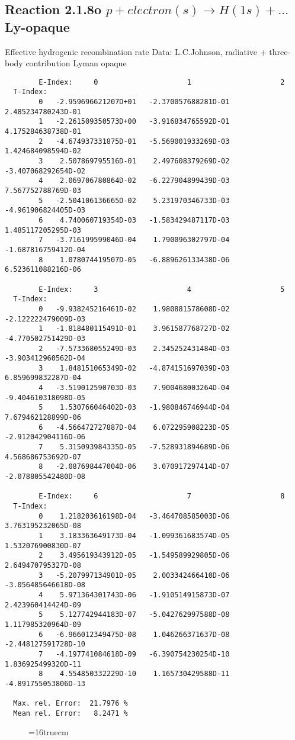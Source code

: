 \documentclass[12pt]{article}
\begin{document}
\subsection{
  Reaction 2.1.8o $ p + electron(s) \rightarrow H(1s) + ...$ Ly-opaque
}

   Effective hydrogenic recombination rate
   Data: L.C.Johnson, radiative + three-body contribution
   Lyman opaque


\begin{small}\begin{verbatim}
        E-Index:     0                     1                     2
  T-Index:
        0   -2.959696621207D+01   -2.370057688281D-01    2.485234780243D-01
        1   -2.261509350573D+00   -3.916834765592D-01    4.175284638738D-01
        2   -4.674937331875D-01   -5.569001933269D-03    1.424684098594D-02
        3    2.507869795516D-01    2.497608379269D-02   -3.407068292654D-02
        4    2.069706780864D-02   -6.227904899439D-03    7.567752788769D-03
        5   -2.504106136665D-02    5.231970346733D-03   -4.961906824405D-03
        6    4.740060719354D-03   -1.583429487117D-03    1.485117205295D-03
        7   -3.716199599046D-04    1.790096302797D-04   -1.687816759412D-04
        8    1.078074419507D-05   -6.889626133438D-06    6.523611088216D-06

        E-Index:     3                     4                     5
  T-Index:
        0   -9.938245216461D-02    1.980881578608D-02   -2.122222479009D-03
        1   -1.818480115491D-01    3.961587768727D-02   -4.770502751429D-03
        2   -7.573368055249D-03    2.345252431484D-03   -3.903412960562D-04
        3    1.848151065349D-02   -4.874151697039D-03    6.859699832287D-04
        4   -3.519012590703D-03    7.900468003264D-04   -9.404610318098D-05
        5    1.530766046402D-03   -1.980846746944D-04    7.679462128899D-06
        6   -4.566472727887D-04    6.072295908223D-05   -2.912042904116D-06
        7    5.315093984335D-05   -7.528931894689D-06    4.568686753692D-07
        8   -2.087698447004D-06    3.070917297414D-07   -2.078805542480D-08

        E-Index:     6                     7                     8
  T-Index:
        0    1.218203616198D-04   -3.464708585003D-06    3.763195232065D-08
        1    3.183363649173D-04   -1.099361683574D-05    1.532076900830D-07
        2    3.495619343912D-05   -1.549589929805D-06    2.649470795327D-08
        3   -5.207997134901D-05    2.003342466410D-06   -3.056485646618D-08
        4    5.971364301743D-06   -1.910514915873D-07    2.423960414424D-09
        5    5.127742944183D-07   -5.042762997588D-08    1.117985320964D-09
        6   -6.966012349475D-08    1.046266371637D-08   -2.448127591728D-10
        7   -4.197741084618D-09   -6.390754230254D-10    1.836925499320D-11
        8    4.554850332229D-10    1.165730429588D-11   -4.891755053806D-13

  Max. rel. Error:  21.7976 %
  Mean rel. Error:   8.2471 %

\end{verbatim}\end{small}
\begin{figure} \label{2.1.8o}
\epsfxsize=16truecm
\end{figure}
\newpage
\end{document}
